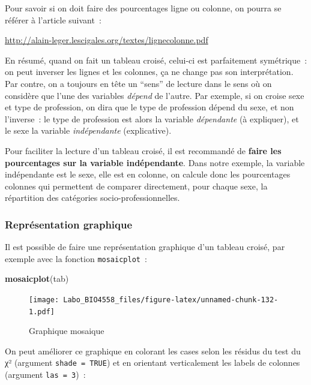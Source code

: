 \documentclass[12pt,]{book}
\makeatletter
\newenvironment{Shaded}{\begin{snugshade}}{\end{snugshade}}
\newcommand{\KeywordTok}[1]{\textcolor[rgb]{0.27,0.27,0.27}{\textbf{#1}}}
\newcommand{\NormalTok}[1]{#1}
\newenvironment{kframe}{%
\medskip{}
\setlength{\fboxsep}{.8em}
 \def\at@end@of@kframe{}%
 \ifinner\ifhmode%
  \def\at@end@of@kframe{\end{minipage}}%
  \begin{minipage}{\columnwidth}%
 \fi\fi%
 \def\FrameCommand##1{\hskip\@totalleftmargin \hskip-\fboxsep
 \colorbox{shadecolor}{##1}\hskip-\fboxsep
     \hskip-\linewidth \hskip-\@totalleftmargin \hskip\columnwidth}%
 \MakeFramed {\advance\hsize-\width
   \@totalleftmargin\z@ \linewidth\hsize
   \@setminipage}}%
 {\par\unskip\endMakeFramed%
 \at@end@of@kframe}
\newenvironment{rmdblock}[1]
  {
  \begin{itemize}
  \renewcommand{\labelitemi}{
    \raisebox{-.7\height}[0pt][0pt]{
      {\setkeys{Gin}{width=3em,keepaspectratio}\texttt{[image: images/\#1]}}
    }
  }
  \setlength{\fboxsep}{1em}
  \begin{kframe}
  \item
  }
  {
  \end{kframe}
  \end{itemize}
  }
\newenvironment{rmdnote}
  {\begin{rmdblock}{note}}
  {\end{rmdblock}}
\makeatother
\begin{document}
\begin{rmdnote}
Pour savoir si on doit faire des pourcentages ligne ou colonne, on
pourra se référer à l'article suivant~:

\url{http://alain-leger.lescigales.org/textes/lignecolonne.pdf}

En résumé, quand on fait un tableau croisé, celui-ci est parfaitement
symétrique~: on peut inverser les lignes et les colonnes, ça ne change
pas son interprétation. Par contre, on a toujours en tête un ``sens'' de
lecture dans le sens où on considère que l'une des variables
\emph{dépend} de l'autre. Par exemple, si on croise sexe et type de
profession, on dira que le type de profession dépend du sexe, et non
l'inverse~: le type de profession est alors la variable
\emph{dépendante} (à expliquer), et le sexe la variable
\emph{indépendante} (explicative).

Pour faciliter la lecture d'un tableau croisé, il est recommandé de
\textbf{faire les pourcentages sur la variable indépendante}. Dans notre
exemple, la variable indépendante est le sexe, elle est en colonne, on
calcule donc les pourcentages colonnes qui permettent de comparer
directement, pour chaque sexe, la répartition des catégories
socio-professionnelles.
\end{rmdnote}

\hypertarget{repruxe9sentation-graphique}{%
\subsubsection{Représentation graphique}\label{repruxe9sentation-graphique}}

Il est possible de faire une représentation graphique d'un tableau croisé, par exemple avec la fonction \texttt{mosaicplot}~:

\begin{Shaded}
\begin{Highlighting}[]
\KeywordTok{mosaicplot}\NormalTok{(tab)}
\end{Highlighting}
\end{Shaded}

\begin{figure}
\centering
\texttt{[image: Labo\_BIO4558\_files/figure-latex/unnamed-chunk-132-1.pdf]}
\caption{\label{fig:unnamed-chunk-132}Graphique mosaique}
\end{figure}

On peut améliorer ce graphique en colorant les cases selon les résidus du test du χ² (argument \texttt{shade\ =\ TRUE}) et en orientant verticalement les labels de colonnes (argument \texttt{las\ =\ 3})~:
\end{document}
